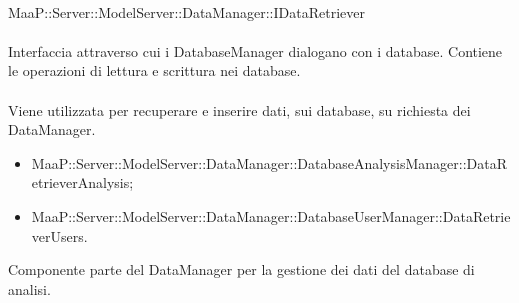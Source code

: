 \\
MaaP::Server::ModelServer::DataManager::IDataRetriever\\
\\
Interfaccia attraverso cui i DatabaseManager dialogano con i database. Contiene le operazioni di lettura e scrittura nei database.\\
\\
Viene utilizzata per recuperare e inserire dati, sui database, su richiesta dei DataManager.\\
\begin{itemize}
\item MaaP::Server::ModelServer::DataManager::DatabaseAnalysisManager::DataRetrieverAnalysis;
\item MaaP::Server::ModelServer::DataManager::DatabaseUserManager::DataRetrieverUsers.
\end{itemize}

Componente parte del DataManager per la gestione dei dati del database di analisi.

